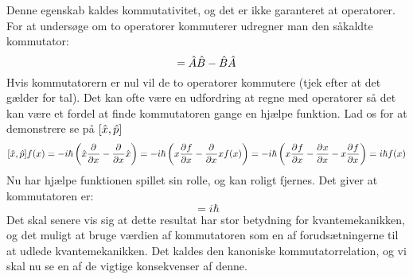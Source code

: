 \documentclass[../Kvantemekanik.tex]{subfiles}
\begin{document}
Denne egenskab kaldes kommutativitet, og det er ikke garanteret at operatorer. For at undersøge om to operatorer kommuterer udregner man den såkaldte kommutator:
\begin{equation}
[\op A,\op B] = \op A \op B-\op B \op A
\end{equation}
Hvis kommutatorern er nul vil de to operatorer kommutere (tjek efter at det gælder for tal). Det kan ofte være en udfordring at regne med operatorer så det kan være et fordel at finde kommutatoren gange en hjælpe funktion. Lad os for at demonstrere se på $[\op x,\op p]$
$$
[\op x,\op p] f(x) = -i\hbar\left(\op x\pdif{x}{}-\pdif{x}{}\op x\right) = -i \hbar \left(x\pdif{x}{f}-\pdif{x}{}xf(x)\right)=-i\hbar \left(x\pdif{x}{f}-\pdif{x}{x}-x\pdif{x}{f}\right) = i\hbar f(x)
$$
Nu har hjælpe funktionen spillet sin rolle, og kan roligt fjernes. Det giver at kommutatoren er:
\begin{equation}
[\op x,\op p] = i\hbar
\label{kvant:eq:kankom}
\end{equation}
Det skal senere vis sig at dette resultat har stor betydning for kvantemekanikken, og det muligt at bruge værdien af kommutatoren som en af forudsætningerne til at udlede kvantemekanikken.
Det kaldes den kanoniske kommutatorrelation, og vi skal nu se en af de vigtige konsekvenser af denne.
\end{document}
